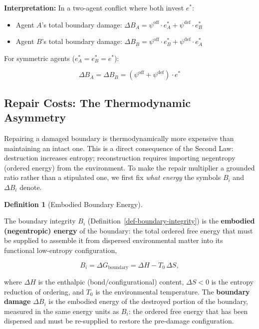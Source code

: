 \documentclass[11pt]{article}
\theoremstyle{plain}
\theoremstyle{definition}
\newtheorem{definition}{Definition}
\theoremstyle{remark}
\let\origsubsection\subsection
\renewcommand{\subsection}{\needspace{7\baselineskip}\origsubsection}
\providecommand{\tightlist}{%
  \setlength{\itemsep}{0pt}\setlength{\parskip}{0pt}}
\begin{document}
\textbf{Interpretation:} In a two-agent conflict where both invest
\(e^*\):

\begin{itemize}
\tightlist
\item
  Agent \(A\)'s total boundary damage:
  \(\Delta B_A = \psi^{\text{off}} \cdot e_A^* + \psi^{\text{def}} \cdot e_B^*\)
\item
  Agent \(B\)'s total boundary damage:
  \(\Delta B_B = \psi^{\text{off}} \cdot e_B^* + \psi^{\text{def}} \cdot e_A^*\)
\end{itemize}

For symmetric agents (\(e_A^* = e_B^* = e^*\)):

\[\Delta B_A = \Delta B_B = (\psi^{\text{off}} + \psi^{\text{def}}) \cdot e^*\]

\subsection{Repair Costs: The Thermodynamic
Asymmetry}\label{repair-costs-the-thermodynamic-asymmetry}

Repairing a damaged boundary is thermodynamically more expensive than
maintaining an intact one. This is a direct consequence of the Second
Law: destruction increases entropy; reconstruction requires importing
negentropy (ordered energy) from the environment. To make the repair
multiplier a grounded ratio rather than a stipulated one, we first fix
\emph{what energy} the symbols \(B_i\) and \(\Delta B_i\) denote.

\begin{definition}[Embodied Boundary Energy]
\label{def-embodied-energy}

The boundary integrity $B_i$ (Definition~\ref{def-boundary-integrity}) is the \textbf{embodied (negentropic) energy} of the boundary: the total ordered free energy that must be supplied to assemble it from dispersed environmental matter into its functional low-entropy configuration,

$$B_i = \Delta G_{\text{boundary}} = \Delta H - T_0 \, \Delta S,$$

where $\Delta H$ is the enthalpic (bond/configurational) content, $\Delta S < 0$ is the entropy reduction of ordering, and $T_0$ is the environmental temperature. The \textbf{boundary damage} $\Delta B_i$ is the embodied energy of the destroyed portion of the boundary, measured in the same energy units as $B_i$: the ordered free energy that has been dispersed and must be re-supplied to restore the pre-damage configuration.
\end{definition}
\end{document}
